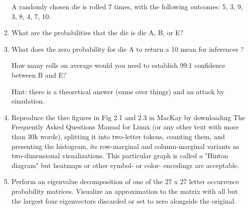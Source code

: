 \documentclass[12pt]{book}
\theoremstyle{definition}
\begin{document}
\begin{enumerate}
A randomly chosen die is rolled 7 times, with the following outcomes: 5, 3, 9, 3, 8, 4, 7, 10.

\item What are the probabilities that the die is die A, B, or E?

\item\label{convert}

What does the zero probability for die A to return a 10 mean for inferences ? 

How many rolls on average would you need to establish 99:1 confidence between B and E? 

Hint: there is a theoretical answer (sums over things) and an attack by simulation.

\item
Reproduce the thre figures in Fig 2.1 and 2.3 in MacKay by downloading The Frequently Asked Questions Manual for Linux (or any other text with more than 30k words), splitting it into two-letter tokens, counting them, and presenting the histogram, its row-marginal and column-marginal variants as two-dimensional visualizations.  This particular graph is called a "Hinton diagram" but heatmaps or other symbol- or color- encodings are acceptable.

\item
Perform an eigenvalue decomposition of one of the 27 x 27 letter occurrence probability matrices.  Visualize an approximation to the matrix with all but the largest four eigenvectors discarded or set to zero alongside the original.



\end{enumerate}
\end{document}

